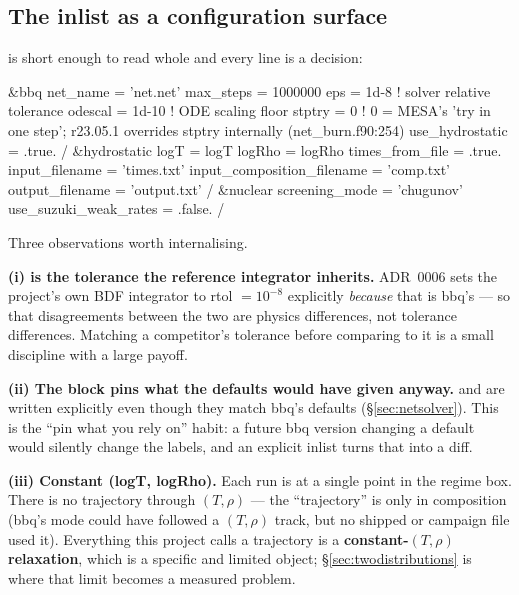 \subsection{The inlist as a configuration surface}
\label{sec:inlist}

 is short enough to read whole and
every line is a decision:

\begin{srclistingtiny}
&bbq
   net_name = '{net}.net'
   max_steps = 1000000
   eps = 1d-8            ! solver relative tolerance
   odescal = 1d-10       ! ODE scaling floor
   stptry = 0            ! 0 = MESA's 'try in one step'; r23.05.1 overrides stptry internally (net_burn.f90:254)
   use_hydrostatic = .true.
/
&hydrostatic
   logT = {logT}
   logRho = {logRho}
   times_from_file = .true.
   input_filename = 'times.txt'
   input_composition_filename = 'comp.txt'
   output_filename = 'output.txt'
/
&nuclear
   screening_mode = 'chugunov'
   use_suzuki_weak_rates = .false.
/
\end{srclistingtiny}

Three observations worth internalising.

\textbf{(i)  is the tolerance the reference integrator
inherits.} ADR~0006 sets the project's own BDF integrator to rtol $= 10^{-8}$
explicitly \emph{because} that is bbq's  --- so that disagreements
between the two are physics differences, not tolerance differences. Matching a
competitor's tolerance before comparing to it is a small discipline with a
large payoff.

\textbf{(ii) The  block pins what the defaults would have given
anyway.}  and  are written
explicitly even though they match bbq's defaults (\S\ref{sec:netsolver}). This
is the ``pin what you rely on'' habit: a future bbq version changing a default
would silently change the labels, and an explicit inlist turns that into a
diff.

\textbf{(iii) Constant (logT, logRho).} Each run is at a single point in the
regime box. There is no trajectory through $(T, \rho)$ --- the ``trajectory''
is only in composition (bbq's  mode could have followed a
$(T, \rho)$ track, but no shipped or campaign file used it). Everything this
project calls a trajectory is a \textbf{constant-$(T, \rho)$ relaxation}, which
is a specific and limited object; \S\ref{sec:twodistributions} is where that
limit becomes a measured problem.


